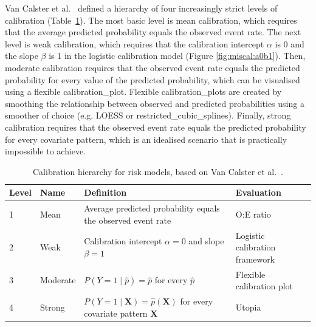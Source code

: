 Van Calster et al.\ \cite{vancalsterCalibrationHierarchyRisk2016} defined a hierarchy of four increasingly strict levels of calibration (Table~\ref{tab:intro:calhierarchy}). The most basic level is mean calibration, which requires that the average predicted probability equals the observed event rate. The next level is weak calibration, which requires that the calibration intercept $\alpha$ is 0 and the slope $\beta$ is 1 in the logistic calibration model (Figure \ref{fig:miscal:a0b1}). Then, moderate calibration requires that the observed event rate equals the predicted probability for every value of the predicted probability, which can be visualised using a flexible \gls{calibration_plot}. Flexible \glspl{calibration_plot} are created by smoothing the relationship between observed and predicted probabilities using a smoother of choice (e.g. \gls{LOESS} or \gls{restricted_cubic_splines}). Finally, strong calibration requires that the observed event rate equals the predicted probability for every covariate pattern, which is an idealised scenario that is practically impossible to achieve. 

\begin{table}[htbp]
\centering
\begin{threeparttable}
\caption[Calibration hierarchy for risk models]{Calibration hierarchy for risk models, based on Van Calster et al.\ \cite{vancalsterCalibrationHierarchyRisk2016}.}
\label{tab:intro:calhierarchy}
\small
\begin{tabularx}{\textwidth}{llXl}
\toprule
\textbf{Level} & \textbf{Name} & \textbf{Definition} & \textbf{Evaluation} \\
\midrule
1 & Mean & Average predicted probability equals the observed event rate & O:E ratio \\
2 & Weak & Calibration intercept $\alpha = 0$ and slope $\beta = 1$ & Logistic calibration framework \\
3 & Moderate  & $P(Y = 1 \mid \hat{p}) = \hat{p}$ for every $\hat{p}$ & Flexible calibration plot \\
4 & Strong & $P(Y = 1 \mid \mathbf{X}) = \hat{p}(\mathbf{X})$ for every covariate pattern $\mathbf{X}$ & Utopia \\
\bottomrule
\end{tabularx}
\end{threeparttable}
\end{table}



